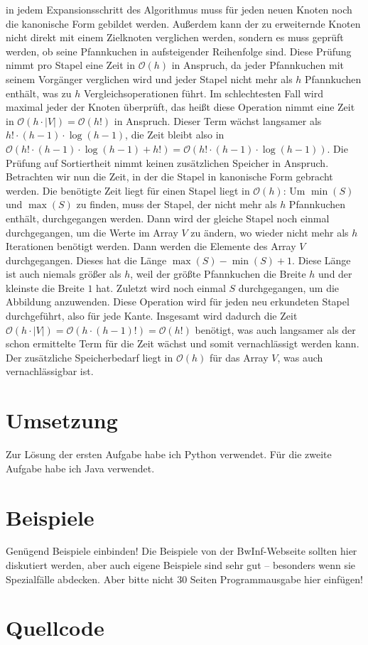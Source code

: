 \documentclass[a4paper,10pt,ngerman]{scrartcl}
\begin{document}
in jedem Expansionsschritt des Algorithmus muss für jeden neuen Knoten noch die kanonische Form gebildet werden. Außerdem kann der zu erweiternde Knoten nicht direkt
mit einem Zielknoten verglichen werden, sondern es muss geprüft werden, ob seine Pfannkuchen in aufsteigender Reihenfolge sind. Diese Prüfung nimmt pro Stapel eine Zeit in
$\mathcal{O}(h)$ in Anspruch, da jeder Pfannkuchen mit seinem Vorgänger verglichen wird und jeder Stapel nicht mehr als $h$ Pfannkuchen enthält, was zu $h$ Vergleichsoperationen führt.
Im schlechtesten Fall wird maximal jeder der Knoten überprüft, das heißt diese Operation nimmt eine Zeit in $\mathcal{O}(h \cdot |V|) = \mathcal{O}(h!)$ in Anspruch. Dieser Term
wächst langsamer als $h! \cdot (h-1) \cdot \log (h-1)$, die Zeit bleibt also in $\mathcal{O}(h! \cdot (h-1) \cdot \log (h-1) + h!) = \mathcal{O}(h! \cdot (h-1) \cdot \log (h-1))$. Die
Prüfung auf Sortiertheit nimmt keinen zusätzlichen Speicher in Anspruch.\\
Betrachten wir nun die Zeit, in der die Stapel in kanonische Form gebracht werden. Die benötigte Zeit liegt für einen Stapel liegt in $\mathcal{O}(h)$: Um $\min(S)$ und $\max(S)$ zu finden, muss der 
Stapel, der nicht mehr als $h$ Pfannkuchen enthält, durchgegangen werden. Dann wird der gleiche Stapel noch einmal durchgegangen, um die Werte im Array $V$ zu ändern, wo wieder nicht mehr als
$h$ Iterationen benötigt werden. Dann werden die Elemente des Array $V$ durchgegangen. Dieses hat die Länge $\max(S) - \min(S) + 1$. Diese Länge ist auch niemals größer als $h$, weil 
der größte Pfannkuchen die Breite $h$ und der kleinste die Breite $1$ hat. Zuletzt wird noch einmal $S$ durchgegangen, um die Abbildung anzuwenden. Diese Operation wird für jeden neu
erkundeten Stapel durchgeführt, also für jede Kante. Insgesamt wird dadurch die Zeit $\mathcal{O}(h \cdot |V|) = \mathcal{O}(h \cdot (h-1)!) = \mathcal{O}(h!)$ benötigt, was auch langsamer
als der schon ermittelte Term für die Zeit wächst und somit vernachlässigt werden kann. Der zusätzliche Speicherbedarf liegt in $\mathcal{O}(h)$ für das Array $V$, was auch vernachlässigbar ist.
\section{Umsetzung}
Zur Lösung der ersten Aufgabe habe ich Python verwendet. Für die zweite Aufgabe
habe ich Java verwendet.

\section{Beispiele}
Genügend Beispiele einbinden! Die Beispiele von der BwInf-Webseite sollten hier
diskutiert werden, aber auch eigene Beispiele sind sehr gut – besonders wenn
sie Spezialfälle abdecken. Aber bitte nicht 30 Seiten Programmausgabe hier
einfügen!

\section{Quellcode}




\begingroup
\def\chapter*#1{}

\endgroup
\end{document}
